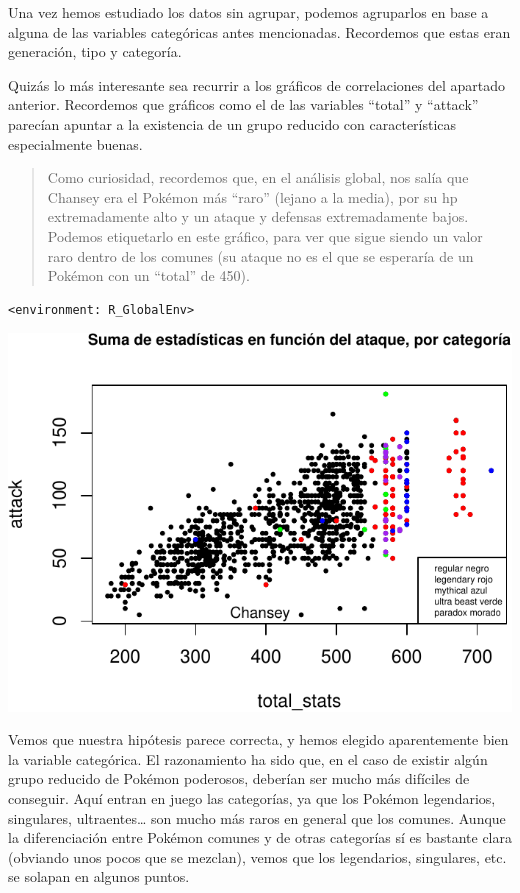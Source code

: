 \documentclass[
  11.8pt,
]{extreport}
\begin{document}
Una vez hemos estudiado los datos sin agrupar, podemos agruparlos en
base a alguna de las variables categóricas antes mencionadas. Recordemos
que estas eran generación, tipo y categoría.

Quizás lo más interesante sea recurrir a los gráficos de correlaciones
del apartado anterior. Recordemos que gráficos como el de las variables
``total'' y ``attack'' parecían apuntar a la existencia de un grupo
reducido con características especialmente buenas.

\begin{quote}
Como curiosidad, recordemos que, en el análisis global, nos salía que
Chansey era el Pokémon más ``raro'' (lejano a la media), por su hp
extremadamente alto y un ataque y defensas extremadamente bajos. Podemos
etiquetarlo en este gráfico, para ver que sigue siendo un valor raro
dentro de los comunes (su ataque no es el que se esperaría de un Pokémon
con un ``total'' de 450).
\end{quote}

\begin{verbatim}
<environment: R_GlobalEnv>
\end{verbatim}

\begin{center}
\includegraphics{trabajo_files/figure-pdf/unnamed-chunk-16-1.pdf}
\end{center}

Vemos que nuestra hipótesis parece correcta, y hemos elegido
aparentemente bien la variable categórica. El razonamiento ha sido que,
en el caso de existir algún grupo reducido de Pokémon poderosos,
deberían ser mucho más difíciles de conseguir. Aquí entran en juego las
categorías, ya que los Pokémon legendarios, singulares,
ultraentes\ldots{} son mucho más raros en general que los comunes.
Aunque la diferenciación entre Pokémon comunes y de otras categorías sí
es bastante clara (obviando unos pocos que se mezclan), vemos que los
legendarios, singulares, etc. se solapan en algunos puntos.
\end{document}
